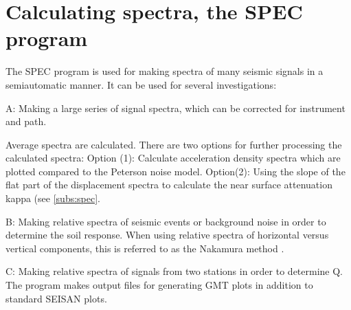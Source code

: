 
\section{Calculating spectra, the SPEC program}
\label{sect:spec}

The SPEC program is used for making spectra of many seismic signals 
in a semiautomatic manner. It can be used for several investigations: 

A: Making a large series of signal spectra, which can be corrected for instrument and path.  

Average spectra are calculated. There are two options for further processing the calculated spectra:  \newline
Option (1): Calculate acceleration density spectra which are plotted compared to the Peterson noise model.\newline
Option(2): Using the slope of the flat part of the displacement spectra to calculate the near surface attenuation kappa (see \ref{subs:spec}.  

B: Making relative spectra of seismic events or background noise in order to determine the soil response. When using relative spectra of horizontal versus vertical components, this is referred to as the Nakamura method \citep{nakamura1989}. 

C: Making relative spectra of signals from two stations in order to determine Q. The program makes output files for generating GMT plots in addition to standard SEISAN plots. 

